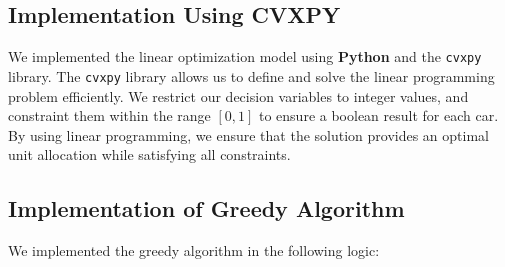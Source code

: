 \documentclass{article}
\begin{document}
\subsection{Implementation Using CVXPY}
We implemented the linear optimization model using \textbf{Python} and the \texttt{cvxpy} library.
The \texttt{cvxpy} library allows us to define and solve the linear programming problem efficiently. We restrict our decision variables to integer values, and constraint them within the range $[0,1]$ to ensure a boolean result for each car. By using linear programming, we ensure that the solution provides an optimal unit allocation while satisfying all constraints.

\subsection{Implementation of Greedy Algorithm}
We implemented the greedy algorithm in the following logic:
\end{document}
